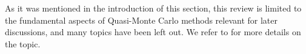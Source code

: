 \documentclass[twoside,11pt]{book}
\newtheorem{theorem}{Theorem}
\newtheorem{definition}{Definition}
\numberwithin{theorem}{chapter}
\numberwithin{definition}{chapter}
\numberwithin{proposition}{chapter}
\numberwithin{corollary}{chapter}
\numberwithin{example}{chapter}
\numberwithin{lemma}{chapter}
\begin{document}






As it was mentioned in the introduction of this section, this review is limited to the fundamental aspects of Quasi-Monte Carlo methods relevant for later discussions, and many topics have been left out. We refer to \citep{DiPi14} for more details on the topic. 



\end{document}
